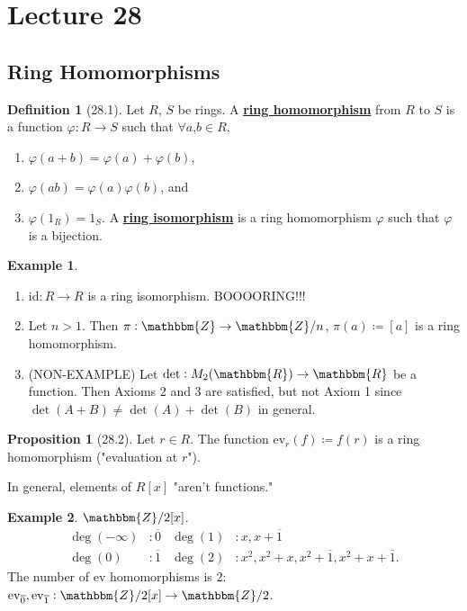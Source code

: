 \documentclass{article}
\newcommand{\Z}{\mathbbm{Z}}
\newcommand{\R}{\mathbbm{R}}
\newcommand{\coleq}{\coloneqq}
\newcommand{\id}{\mathrm{id}}
\newcommand{\define}[1]{\textbf{\underline{#1}}}
\newcommand{\func}[3]{#1: #2 \to #3}
\theoremstyle{definition}
\newtheorem*{defn}{Definition}
\newtheorem*{prop}{Proposition}
\newtheorem*{ex}{Example}
\theoremstyle{remark}
\newcommand{\ev}{\mathrm{ev}}
\begin{document}
    \section*{Lecture 28}{
        \subsection*{Ring Homomorphisms}{
            \begin{defn}[28.1]
                Let $R$, $S$ be rings. A \define{ring homomorphism} from $R$ to $S$ is a function $\func{\varphi}{R}{S}$ such that $\forall a$,$b \in R$,
                \begin{enumerate}
                    \item $\varphi(a+b)=\varphi(a)+\varphi(b)$,
                    \item $\varphi(ab)=\varphi(a)\varphi(b)$, and
                    \item $\varphi(1_R)=1_S$.
                A \define{ring isomorphism} is a ring homomorphism $\varphi$ such that $\varphi$ is a bijection.
                \end{enumerate}
            \end{defn}
            
            \begin{ex}
                \begin{enumerate}
                    \item $\func{\id}{R}{R}$ is a ring isomorphism. BOOOORING!!!
                    \item Let $n>1$. Then $\func{\pi}{\Z}{\Z/n}$, $\pi(a)\coleq[a]$ is a ring homomorphism.
                    \item (NON-EXAMPLE) Let $\func{\det}{M_2(\R)}{\R}$ be a function. Then Axioms 2 and 3 are satisfied, but not Axiom 1 since $\det(A+B)\neq \det(A)+\det(B)$ in general.
                \end{enumerate}
            \end{ex}
            
            \begin{prop}[28.2]
                Let $r \in R$. The function $\ev_r(f)\coleq f(r)$ is a ring homomorphism ("evaluation at $r$").
            \end{prop}
            
            In general, elements of $R[x]$ "aren't functions."
            
            \begin{ex}
                $\Z/2[x]$.
                \begin{align*}
                    \deg(-\infty)&: \overline{0}   &    \deg(1)&: x,x+\overline{1}\\
                    \deg(0)&: \overline{1}   &   \deg(2)&: x^2,x^2+x,x^2+\overline{1},x^2+x+\overline{1}.
                \end{align*}
                The number of $\ev$ homomorphisms is $2$: $\func{\ev_{\overline{0}},\ev_{\overline{1}}}{\Z/2[x]}{\Z/2}$.\\
                

\end{ex}}}
\end{document}
